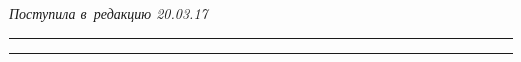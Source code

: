 \vspace*{-3pt}





\hfill{\small\textit{Поступила в~редакцию 20.03.17}}














\vspace*{9pt}





\hrule





\vspace*{2pt}















\hrule
















\def\tit{IMITATION MODEL OF~INSIDER DETECTION\\  BY~STATISTICAL TECHNIQUES}





\def\titkol{Imitation model of~insider detection  by~statistical techniques}








\def\aut{E.\,A.~Martyanov}


\def\autkol{E.\,A.~Martyanov}











